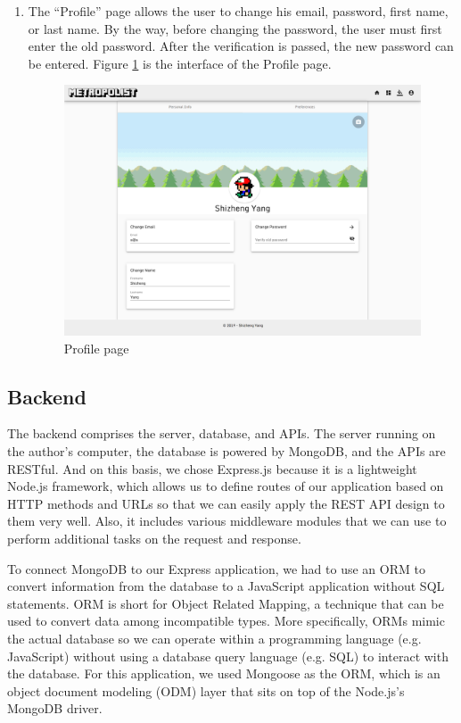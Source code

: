 \begin{enumerate}
  \item The ``Profile'' page allows the user to change his email, password, first name, or last name. By the way, before changing the password, the user must first enter the old password. After the verification is passed, the new password can be entered. Figure \ref{fig:GUI profile} is the interface of the Profile page.

  \begin{figure}[htbp]
    \includegraphics[width=\textwidth]{section04/assets/GUI-profile.png}
    \caption{Profile page}
    \label{fig:GUI profile}
  \end{figure}

\end{enumerate}

\subsection{Backend}
The backend comprises the server, database, and APIs. The server running on the author's computer, the database is powered by MongoDB, and the APIs are RESTful. And on this basis, we chose Express.js because it is a lightweight Node.js framework, which allows us to define routes of our application based on HTTP methods and URLs so that we can easily apply the REST API design to them very well. Also, it includes various middleware modules that we can use to perform additional tasks on the request and response.

To connect MongoDB to our Express application, we had to use an ORM to convert information from the database to a JavaScript application without SQL statements. ORM is short for Object Related Mapping, a technique that can be used to convert data among incompatible types. More specifically, ORMs mimic the actual database so we can operate within a programming language (e.g. JavaScript) without using a database query language (e.g. SQL) to interact with the database. For this application, we used Mongoose as the ORM, which is an object document modeling (ODM) layer that sits on top of the Node.js's MongoDB driver.

